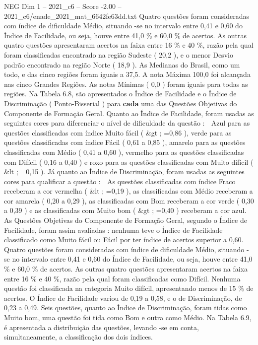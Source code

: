 \begin{textsample}{NEG Dim 1 – 2021\_c6 – Score -2.00 – 2021\_c6/enade\_2021\_mat\_6642fe63dd.txt}
Quatro questões foram consideradas com índice de dificuldade Médio, situando -se no intervalo entre 0,41 e 0,60 do Índice de Facilidade, ou seja, houve entre 41,0 \% e 60,0 \% de acertos.
As outras quatro questões apresentaram acertos na faixa entre 16 \% e 40 \%, razão pela qual foram classificadas encontrado na região Sudeste ( 20,2 ), e o menor Desvio padrão encontrado na região Norte ( 18,9 ).
As Medianas do Brasil, como um todo, e das cinco regiões foram iguais a 37,5.
A nota Máxima 100,0 foi alcançada nas cinco Grandes Regiões.
As notas Mínimas ( 0,0 ) foram iguais para todas as regiões.
Na Tabela 6.8, são apresentados o Índice de Facilidade e o Índice de Discriminação ( Ponto-Bisserial ) para \textbf{cada} uma das Questões Objetivas do Componente de Formação Geral.
Quanto ao Índice de Facilidade, foram usadas as seguintes cores para diferenciar o nível de dificuldade da questão :  Azul para as questões classificadas com índice Muito fácil ( \&gt ; =0,86 ), verde para as questões classificadas com índice Fácil ( 0,61 a 0,85 ), amarelo para as questões classificadas com Médio ( 0,41 a 0,60 ), vermelho para as questões classificadas com Difícil ( 0,16 a 0,40 ) e roxo para as questões classificadas com Muito difícil ( \&lt ; =0,15 ).
Já quanto ao Índice de Discriminação, foram usadas as seguintes cores para qualificar a questão :  As questões classificadas com índice Fraco receberam a cor vermelha ( \&lt ; =0,19 ), as classificadas com Médio receberam a cor amarela ( 0,20 a 0,29 ), as classificadas com Bom receberam a cor verde ( 0,30 a 0,39 ) e as classificadas com Muito bom ( \&gt ; =0,40 ) receberam a cor azul.
As Questões Objetivas do Componente de Formação Geral, segundo o Índice de Facilidade, foram assim avaliadas : nenhuma teve o Índice de Facilidade classificado como Muito fácil ou Fácil por ter índice de acertos superior a 0,60.
Quatro questões foram consideradas com índice de dificuldade Médio, situando -se no intervalo entre 0,41 e 0,60 do Índice de Facilidade, ou seja, houve entre 41,0 \% e 60,0 \% de acertos.
As outras quatro questões apresentaram acertos na faixa entre 16 \% e 40 \%, razão pela qual foram classificadas como Difícil.
Nenhuma questão foi classificada na categoria Muito difícil, apresentando menos de 15 \% de acertos.
O Índice de Facilidade variou de 0,19 a 0,58, e o de Discriminação, de 0,23 a 0,49.
Seis questões, quanto ao Índice de Discriminação, foram tidas como Muito bom, uma questão foi tida como Bom e outra como Médio.
Na Tabela 6.9, é apresentada a distribuição das questões, levando -se em conta, simultaneamente, a classificação dos dois índices.

\end{textsample}
